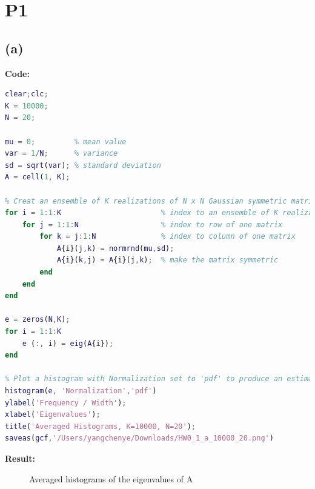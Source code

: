 \documentclass[twoside]{homework}
\begin{document}
\maketitle

\section*{P1}
\subsection*{(a)}
\textbf{Code:}
\begin{lstlisting}[language={Matlab}]
clear;clc;
K = 10000;
N = 20;

mu = 0;         % mean value
var = 1/N;      % variance
sd = sqrt(var); % standard deviation 
A = cell(1, K);

% Creat an ensemble of K realizations of N x N Gaussian symmetric matrices
for i = 1:1:K                       % index to an ensemble of K realizations
    for j = 1:1:N                   % index to row of one matrix
        for k = j:1:N               % index to column of one matrix
            A{i}(j,k) = normrnd(mu,sd);
            A{i}(k,j) = A{i}(j,k);  % make the matrix symmetric
        end
    end
end

e = zeros(N,K);
for i = 1:1:K
    e (:, i) = eig(A{i});
end

% Plot a histogram with Normalization set to 'pdf' to produce an estimation of the probability density function.
histogram(e, 'Normalization','pdf') 
ylabel('Frequency / Width');
xlabel('Eigenvalues');
title('Averaged Histograms, K=10000, N=20');
saveas(gcf,'/Users/yangchenye/Downloads/HW0_1_a_10000_20.png')
\end{lstlisting}
\textbf{Result:}
\begin{figure}[!h]
\centering
{}
\caption{Averaged histograms of the eigenvalues of A}
\end{figure}
\end{document}
